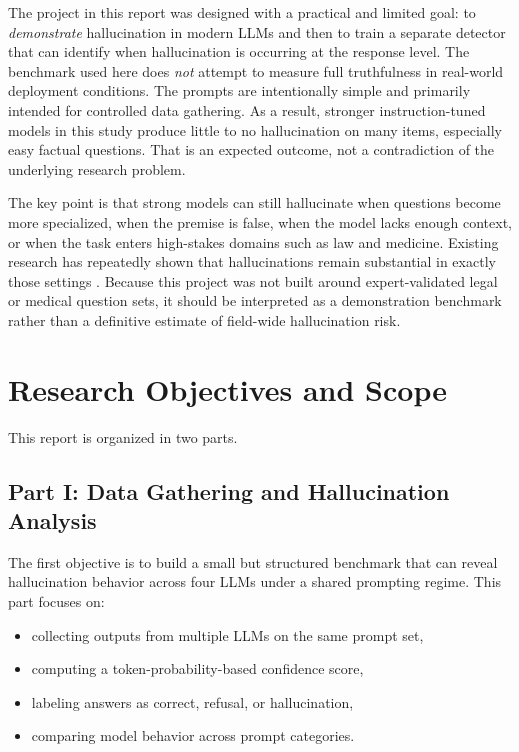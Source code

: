 \documentclass[11pt]{article}
\begin{document}
The project in this report was designed with a practical and limited goal: to \emph{demonstrate} hallucination in modern LLMs and then to train a separate detector that can identify when hallucination is occurring at the response level. The benchmark used here does \emph{not} attempt to measure full truthfulness in real-world deployment conditions. The prompts are intentionally simple and primarily intended for controlled data gathering. As a result, stronger instruction-tuned models in this study produce little to no hallucination on many items, especially easy factual questions. That is an expected outcome, not a contradiction of the underlying research problem.

The key point is that strong models can still hallucinate when questions become more specialized, when the premise is false, when the model lacks enough context, or when the task enters high-stakes domains such as law and medicine. Existing research has repeatedly shown that hallucinations remain substantial in exactly those settings \cite{dahl2024legal, pal2023medhalt, pandit2025medhallu}. Because this project was not built around expert-validated legal or medical question sets, it should be interpreted as a demonstration benchmark rather than a definitive estimate of field-wide hallucination risk.

\section{Research Objectives and Scope}
This report is organized in two parts.

\subsection{Part I: Data Gathering and Hallucination Analysis}
The first objective is to build a small but structured benchmark that can reveal hallucination behavior across four LLMs under a shared prompting regime. This part focuses on:
\begin{itemize}[leftmargin=1.5em]
    \item collecting outputs from multiple LLMs on the same prompt set,
    \item computing a token-probability-based confidence score,
    \item labeling answers as correct, refusal, or hallucination,
    \item comparing model behavior across prompt categories.
\end{itemize}
\end{document}
